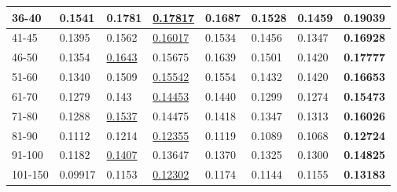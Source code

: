 \begin{table}[h!]
\begin{tabular}{|l|l|l|l|l|l|l||l|}
        36-40       & 0.1541                         & 0.1781                         & \underline{0.17817}            & 0.1687                         & 0.1528                         & 0.1459                          & \textbf{0.19039}           \\ \hline
        41-45       & 0.1395                         & 0.1562                         & \underline{0.16017}            & 0.1534                         & 0.1456                         & 0.1347                          & \textbf{0.16928}           \\ \hline
        46-50       & 0.1354                         & \underline{0.1643}             & 0.15675                        & 0.1639                         & 0.1501                         & 0.1420                          & \textbf{0.17777}           \\ \hline
        51-60       & 0.1340                         & 0.1509                         & \underline{0.15542}            & 0.1554                         & 0.1432                         & 0.1420                          & \textbf{0.16653}           \\ \hline
        61-70       & 0.1279                         & 0.143                          & \underline{0.14453}            & 0.1440                         & 0.1299                         & 0.1274                          & \textbf{0.15473}           \\ \hline
        71-80       & 0.1288                         & \underline{0.1537}             & 0.14475                        & 0.1418                         & 0.1347                         & 0.1313                          & \textbf{0.16026}           \\ \hline
        81-90       & 0.1112                         & 0.1214                         & \underline{0.12355}            & 0.1119                         & 0.1089                         & 0.1068                          & \textbf{0.12724}           \\ \hline
        91-100      & 0.1182                         & \underline{0.1407}             & 0.13647                        & 0.1370                         & 0.1325                         & 0.1300                          & \textbf{0.14825}           \\ \hline
        101-150     & 0.09917                        & 0.1153                         & \underline{0.12302}            & 0.1174                         & 0.1144                         & 0.1155                          & \textbf{0.13183}           \\ \hline

\end{tabular}
\end{table}
